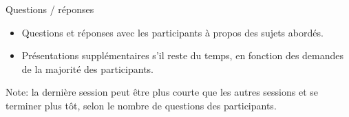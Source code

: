 \documentclass[a4paper,12pt,obeyspaces,spaces,hyphens]{article}
\begin{document}
\feagendaonecolumn
{Questions / réponses}
{
  \begin{itemize}
  \item Questions et réponses avec les participants à propos des sujets abordés.
  \item Présentations supplémentaires s'il reste du temps, en fonction des demandes
        de la majorité des participants.
  \end{itemize}
}

Note: la dernière session peut être plus courte que les autres
sessions et se terminer plus tôt, selon le nombre de questions des
participants.
\end{document}
